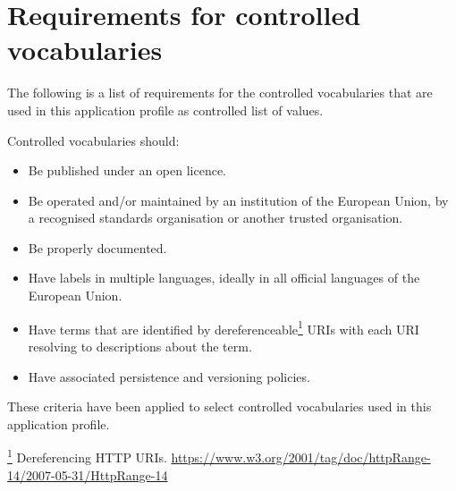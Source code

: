 \hypertarget{ariaid-title1}{%
\section{Requirements for controlled vocabularies}\label{ariaid-title1}}

The following is a list of requirements for the controlled vocabularies
that are used in this application profile as controlled list of values.

Controlled vocabularies should:

\begin{itemize}
\tightlist
\item
  Be published under an open licence.
\item
  Be operated and/or maintained by an institution of the European Union,
  by a recognised standards organisation or another trusted
  organisation.
\item
  Be properly documented.
\item
  Have labels in multiple languages, ideally in all official languages
  of the European Union.
\item
  Have terms that are identified by
  dereferenceable\protect\hyperlink{fntarg_1}{\textsuperscript{1}} URIs
  with each URI resolving to descriptions about the term.
\item
  Have associated persistence and versioning policies.
\end{itemize}

These criteria have been applied to select controlled vocabularies used
in this application profile.

\protect\hyperlink{fnsrc_1}{\textsuperscript{1}} Dereferencing HTTP
URIs.
\url{https://www.w3.org/2001/tag/doc/httpRange-14/2007-05-31/HttpRange-14}
